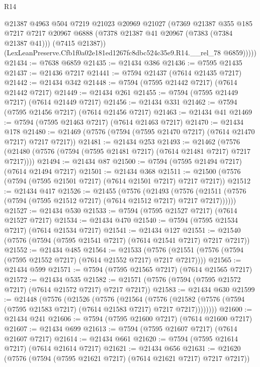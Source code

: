 \begin{lexlean}{R14}
\begin{coremodule}
            @21387
            @4963
            @504
            @7219
            @21023
            @20969
            @21027
            (@7369
              @21387
              @355
              @185
              @7217
              @7217
              @20967
              @6888
              (@7378 @21387 @41 @20967 (@7383 (@7384 @21387 @41)))
              (@7415 @21387))
            (LexLeanPreserve.Cfb1f0a02e181ed1267fc8dbc524c35e9.R14.__rel_78 @6859)))))
@21434 := @7638 @6859
@21435 := @21434 @386
@21436 := @7595 @21435
@21437 := @21436 @7217
@21441 := @7594 @21437 (@7614 @21435 @7217)
@21442 := @21434 @342
@21448 := @7594 (@7595 @21442 @7217) (@7614 @21442 @7217)
@21449 := @21434 @261
@21455 := @7594 (@7595 @21449 @7217) (@7614 @21449 @7217)
@21456 := @21434 @331
@21462 := @7594 (@7595 @21456 @7217) (@7614 @21456 @7217)
@21463 := @21434 @41
@21469 := @7594 (@7595 @21463 @7217) (@7614 @21463 @7217)
@21470 := @21434 @178
@21480 := @21469 (@7576 (@7594 (@7595 @21470 @7217) (@7614 @21470 @7217) @7217 @7217))
@21481 := @21434 @253
@21493 := @21462
    (@7576 (@21480 (@7576 (@7594 (@7595 @21481 @7217) (@7614 @21481 @7217) @7217 @7217))))
@21494 := @21434 @87
@21500 := @7594 (@7595 @21494 @7217) (@7614 @21494 @7217)
@21501 := @21434 @368
@21511 := @21500 (@7576 (@7594 (@7595 @21501 @7217) (@7614 @21501 @7217) @7217 @7217))
@21512 := @21434 @417
@21526 := @21455
    (@7576
      (@21493
        (@7576 (@21511 (@7576 (@7594 (@7595 @21512 @7217) (@7614 @21512 @7217) @7217 @7217))))))
@21527 := @21434 @530
@21533 := @7594 (@7595 @21527 @7217) (@7614 @21527 @7217)
@21534 := @21434 @470
@21540 := @7594 (@7595 @21534 @7217) (@7614 @21534 @7217)
@21541 := @21434 @127
@21551 := @21540 (@7576 (@7594 (@7595 @21541 @7217) (@7614 @21541 @7217) @7217 @7217))
@21552 := @21434 @485
@21564 := @21533
    (@7576 (@21551 (@7576 (@7594 (@7595 @21552 @7217) (@7614 @21552 @7217) @7217 @7217))))
@21565 := @21434 @599
@21571 := @7594 (@7595 @21565 @7217) (@7614 @21565 @7217)
@21572 := @21434 @535
@21582 := @21571 (@7576 (@7594 (@7595 @21572 @7217) (@7614 @21572 @7217) @7217 @7217))
@21583 := @21434 @630
@21599 := @21448
    (@7576
      (@21526
        (@7576
          (@21564
            (@7576
              (@21582 (@7576 (@7594 (@7595 @21583 @7217) (@7614 @21583 @7217) @7217 @7217))))))))
@21600 := @21434 @241
@21606 := @7594 (@7595 @21600 @7217) (@7614 @21600 @7217)
@21607 := @21434 @699
@21613 := @7594 (@7595 @21607 @7217) (@7614 @21607 @7217)
@21614 := @21434 @661
@21620 := @7594 (@7595 @21614 @7217) (@7614 @21614 @7217)
@21621 := @21434 @656
@21631 := @21620 (@7576 (@7594 (@7595 @21621 @7217) (@7614 @21621 @7217) @7217 @7217))

\end{coremodule}
\end{lexlean}
